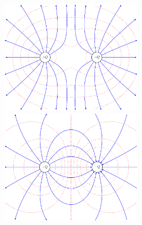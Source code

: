 \begin{figure}
	\noindent\begin{minipage}{0.48\textwidth}
		\begin{center}
			\includegraphics[width=7cm]{f-all-eq-ch.pdf}
		\end{center}
	\end{minipage}\hfill
	\begin{minipage}{0.48\textwidth}
		\begin{center}
			\includegraphics[width=7cm]{f-all-op-ch.pdf}
		\end{center}
	\end{minipage}
\end{figure}

